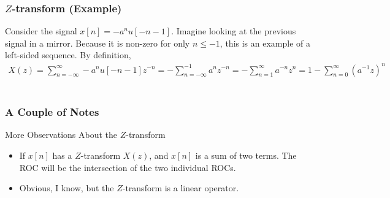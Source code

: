\documentclass[mathserif,9pt,handout]{beamer}
\begin{document}
\begin{frame}\frametitle{$Z$-transform (Example)}\small
  Consider the signal $x[n] = -a^n u[-n-1]$. Imagine looking at the previous signal in a mirror. Because it is non-zero for only $n \leq -1$, this is an example of a left-sided sequence. By definition, 
  \begin{align}
    X(z) = \sum_{n=-\infty}^{\infty} -a^n u[-n-1] z^{-n} = -\sum_{n=-\infty}^{-1} a^n z^{-n}=-\sum_{n=1}^{\infty} a^{-n} z^{n} = 1-\sum_{n=0}^{\infty} (a^{-1} z)^n \nonumber
  \end{align}
  \\
  \vspace{1em}
  
\end{frame}


\begin{frame}\frametitle{A Couple of Notes}\small
  \begin{block}{More Observations About the $Z$-transform}
    \begin{itemize}
      \item If $x[n]$ has a $Z$-transform $X(z)$, and $x[n]$ is a sum of two terms. The ROC will be the intersection of the two individual ROCs. 
      \item Obvious, I know, but the $Z$-transform is a linear operator. 
    \end{itemize}
  \end{block}
\end{frame}
\end{document}

